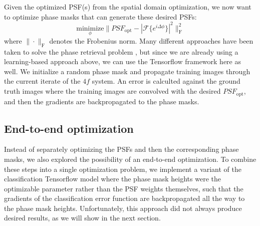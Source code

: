 Given the optimized PSF(s) from the spatial domain optimization, we now want to optimize phase masks that can generate these desired PSFs:
\begin{equation} \underset{\phi}{\text{minimize}} \|PSF_\text{opt} - |\mathcal{F}\{e^{i\Delta \phi}\}|^2\|^2_\text{F}
\end{equation}
where $\|\cdot\|_\text{F}$ denotes the Frobenius norm.  Many different approaches have been taken to solve the phase retrieval problem \cite{shechtman2015phase}, but since we are already using a learning-based approach above, we can use the Tensorflow framework here as well. We initialize a random phase mask and propagate training images through the current iterate of the $4f$ system. An error is calculted against the ground truth images where the training images are convolved with the desired $PSF_\text{opt}$, and then the gradients are backpropagated to the phase masks. 

\subsection*{End-to-end optimization}
Instead of separately optimizing the PSFs and then the corresponding phase masks,  we also explored the possibility of an end-to-end optimization. To combine these steps into a single optimization problem, we implement a variant of the classification Tensorflow model where the phase mask heights were the optimizable parameter rather than the PSF weights themselves, such that the gradients of the classification error function are backpropagated all the way to the phase mask heights. Unfortunately, this approach did not always produce desired results, as we will show in the next section. 